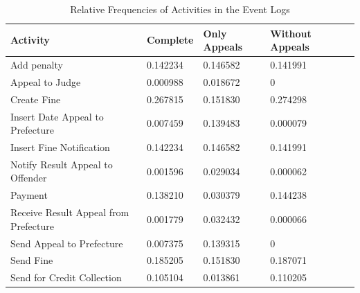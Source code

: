 \documentclass[12pt]{report}
\begin{document}
\begin{table}[H]
\centering
\begin{tabular}{|l|l|l|l|l|}
\hline \textbf{Activity} & \textbf{Complete} & \textbf{Only Appeals} & \textbf{Without Appeals} \\
\hline Add penalty & 0.142234 & 0.146582 & 0.141991\\
\hline Appeal to Judge & 0.000988 & 0.018672 &0\\
\hline Create Fine & 0.267815 & 0.151830 & 0.274298\\
\hline Insert Date Appeal to Prefecture & 0.007459 & 0.139483 & 0.000079\\
\hline Insert Fine Notification & 0.142234 & 0.146582 & 0.141991\\
\hline Notify Result Appeal to Offender & 0.001596 & 0.029034 & 0.000062\\
\hline Payment  & 0.138210 & 0.030379 & 0.144238\\
\hline Receive Result Appeal from Prefecture & 0.001779 & 0.032432 & 0.000066\\
\hline Send Appeal to Prefecture  & 0.007375 & 0.139315 & 0\\
\hline Send Fine  & 0.185205 & 0.151830 & 0.187071\\
\hline Send for Credit Collection & 0.105104 & 0.013861 & 0.110205\\
\hline
\end{tabular}
\caption{Relative Frequencies of Activities in the Event Logs}
\label{tab:1c_relative}
\end{table}
\end{document}
